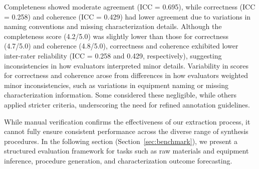 
Completeness showed moderate agreement (ICC = 0.695), while correctness (ICC = 0.258) and coherence (ICC = 0.429) had lower agreement due to variations in naming conventions and missing characterization details.
Although the completeness score (4.2/5.0) was slightly lower than those for correctness (4.7/5.0) and coherence (4.8/5.0), correctness and coherence exhibited lower inter-rater reliability (ICC = 0.258 and 0.429, respectively), suggesting inconsistencies in how evaluators interpreted minor details. 
Variability in scores for correctness and coherence arose from differences in how evaluators weighted minor inconsistencies, such as variations in equipment naming or missing characterization information. Some considered these negligible, while others applied stricter criteria, underscoring the need for refined annotation guidelines.

While manual verification confirms the effectiveness of our extraction process, it cannot fully ensure consistent performance across the diverse range of synthesis procedures. In the following section (Section~\ref{sec:benchmark}), we present a structured evaluation framework for tasks such as raw materials and equipment inference, procedure generation, and characterization outcome forecasting.









